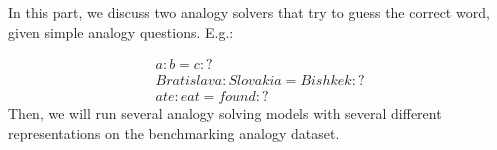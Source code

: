 In this part, we discuss two analogy solvers that try to guess the correct word, given simple analogy questions. E.g.:

\begin{align*}
	a : b = c : ?\\
	Bratislava : Slovakia = Bishkek : ?\\
	ate : eat = found : ?
\end{align*}
\newline
Then, we will run several analogy solving models with several different representations on the benchmarking analogy dataset.
